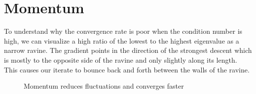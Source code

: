 
\chapter{Momentum}\label{chap: momentum}

To understand why the convergence rate is poor when the condition
number is high, we can visualize a high ratio of the lowest to the highest
eigenvalue as a narrow ravine. The gradient points in the direction of the
strongest descent which is mostly to the opposite side of the ravine and only slightly
along its length. This causes our iterate to bounce back and forth between
the walls of the ravine.
%
\begin{figure}[h]
	\centering
	\def\svgwidth{1\textwidth}
	
	\caption{Momentum reduces fluctuations and converges faster}
	\label{fig: visualize bad conditioning}
\end{figure}

